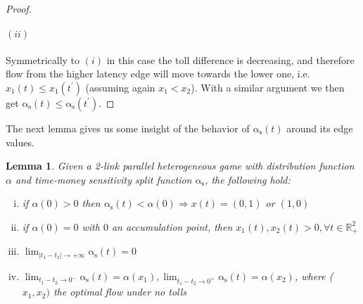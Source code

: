 \documentclass[a4paper,11pt]{article}
\newcommand{\as}{\mathrm{\alpha_s}}
\newtheorem{lemma}{Lemma}[section]
\begin{document}
\begin{proof}
	\paragraph{$(ii)$}
	Symmetrically to $(i)$ in this case the toll difference is decreasing, and therefore flow from the higher latency edge will move towards the lower one, i.e. $x_1(t) \le x_1(t^\prime)$ (assuming again $x_1 < x_2$).
	With a similar argument we then get $\as(t) \le \as(t^\prime)$.
\end{proof}

The next lemma gives us some insight of the behavior of $\as(t)$ around its edge values.
\begin{lemma}
	Given a 2-link parallel heterogeneous game with distribution function $\alpha$ and time-money sensitivity split function $\as$, the following hold:
	\begin{enumerate}[(i)]
		\item if $\alpha(0) > 0$ then $\as(t) < \alpha(0) \Rightarrow x(t) = (0, 1)$ or $(1, 0)$
		\item if $\alpha(0) = 0$ with $0$ an accumulation point, then $x_1(t), x_2(t) > 0, \forall t \in \mathbb{R}_+^2$
		\item $\lim_{|t_1 - t_2| \rightarrow +\infty}\as(t) = 0$
		\item $\lim_{t_1 - t_2 \rightarrow 0^-} \as(t) = \alpha(x_1), \lim_{t_1 - t_2 \rightarrow 0^+} \as(t) = \alpha(x_2)$, where ($x_1, x_2)$ the optimal flow under no tolls
	\end{enumerate}
\end{lemma}
\end{document}
